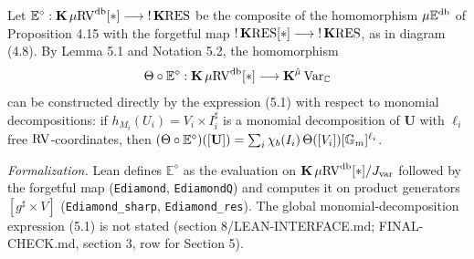 \setcounter{theorem}{9}
\begin{remark}
\label{s8-theta-ediamond}
\leanok
{}
Let $\mathbb E^\diamond : \operatorname{\mathbf{K}} \mu\mathrm{RV}^{\operatorname{db}}[*] \longrightarrow {!\operatorname{\mathbf{K}}}\mathrm{RES}$ be the composite of the homomorphism $\mu\mathbb{E}^{\operatorname{db}}$ of Proposition 4.15 with the forgetful map ${!\operatorname{\mathbf{K}}}\mathrm{RES}[*] \longrightarrow {!\operatorname{\mathbf{K}}}\mathrm{RES}$, as in diagram (4.8). By Lemma 5.1 and Notation 5.2, the homomorphism \[ \Theta \circ \mathbb E^\diamond : \operatorname{\mathbf{K}} \mu\mathrm{RV}^{\operatorname{db}}[*] \longrightarrow \operatorname{\mathbf{K}}^{\hat\mu}\mathrm{Var}_{\mathbb{C}} \] can be constructed directly by the expression (5.1) with respect to monomial decompositions: if $h_{M_i}(U_i) = V_i \times I_i^\sharp$ is a monomial decomposition of $\mathbf U$ with $\ell_i$ free $\mathrm{RV}$-coordinates, then $(\Theta \circ \mathbb E^\diamond)([\mathbf U]) = \sum_i \chi_b(I_i)\, \Theta([V_i])[\mathbb{G}_m]^{\ell_i}$.

\emph{Formalization.} Lean defines $\mathbb E^\diamond$ as the evaluation on $\operatorname{\mathbf{K}} \mu\mathrm{RV}^{\operatorname{db}}[*]/J_{\mathrm{var}}$ followed by the forgetful map (\texttt{Ediamond}, \texttt{EdiamondQ}) and computes it on product generators $[g^\sharp \times V]$ (\texttt{Ediamond\_sharp}, \texttt{Ediamond\_res}). The global monomial-decomposition expression (5.1) is not stated (section 8/LEAN-INTERFACE.md; FINAL-CHECK.md, section 3, row for Section 5).
\end{remark}

